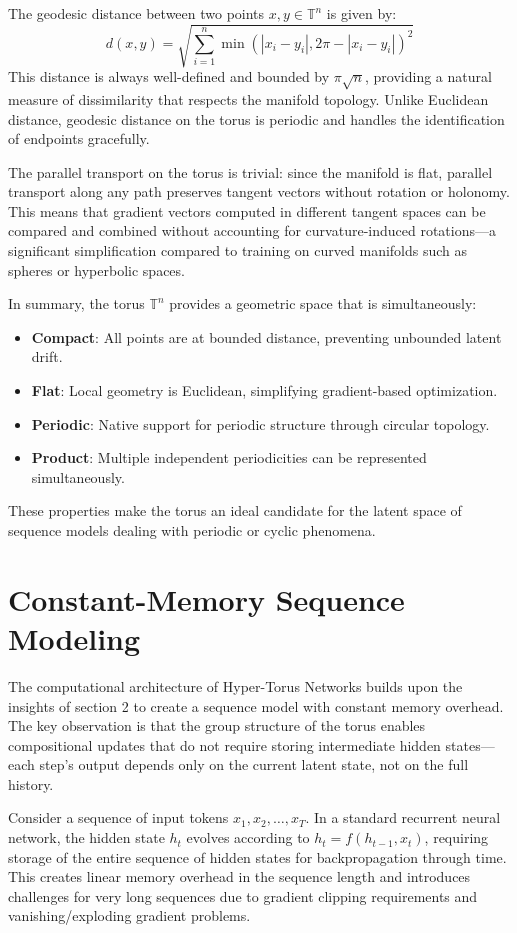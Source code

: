 \documentclass[12pt,letterpaper,twoside]{article}
\newcommand{\T}{\mathbb{T}}
\begin{document}
The geodesic distance between two points $x, y \in \T^n$ is given by:
\begin{equation}
d(x, y) = \sqrt{\sum_{i=1}^n \min(|x_i - y_i|, 2\pi - |x_i - y_i|)^2}
\end{equation}
This distance is always well-defined and bounded by $\pi\sqrt{n}$, providing a natural measure of dissimilarity that respects the manifold topology. Unlike Euclidean distance, geodesic distance on the torus is periodic and handles the identification of endpoints gracefully.

The parallel transport on the torus is trivial: since the manifold is flat, parallel transport along any path preserves tangent vectors without rotation or holonomy. This means that gradient vectors computed in different tangent spaces can be compared and combined without accounting for curvature-induced rotations—a significant simplification compared to training on curved manifolds such as spheres or hyperbolic spaces.

In summary, the torus $\T^n$ provides a geometric space that is simultaneously:
\begin{itemize}
    \item \textbf{Compact}: All points are at bounded distance, preventing unbounded latent drift.
    \item \textbf{Flat}: Local geometry is Euclidean, simplifying gradient-based optimization.
    \item \textbf{Periodic}: Native support for periodic structure through circular topology.
    \item \textbf{Product}: Multiple independent periodicities can be represented simultaneously.
    \end{itemize}
These properties make the torus an ideal candidate for the latent space of sequence models dealing with periodic or cyclic phenomena.

\section{Constant-Memory Sequence Modeling}
The computational architecture of Hyper-Torus Networks builds upon the insights of section 2 to create a sequence model with constant memory overhead. The key observation is that the group structure of the torus enables compositional updates that do not require storing intermediate hidden states—each step's output depends only on the current latent state, not on the full history.

Consider a sequence of input tokens $x_1, x_2, \ldots, x_T$. In a standard recurrent neural network, the hidden state $h_t$ evolves according to $h_t = f(h_{t-1}, x_t)$, requiring storage of the entire sequence of hidden states for backpropagation through time. This creates linear memory overhead in the sequence length and introduces challenges for very long sequences due to gradient clipping requirements and vanishing/exploding gradient problems.
\end{document}
